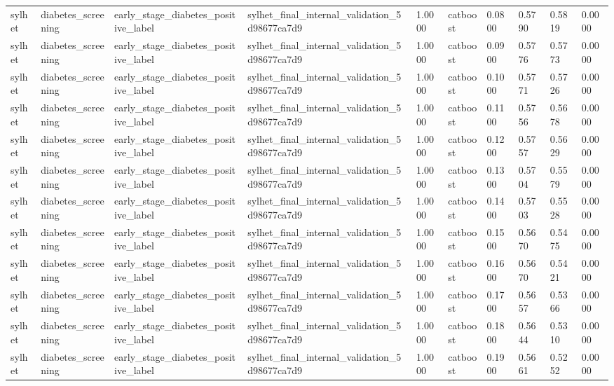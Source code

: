 \begin{tabular}{llllllllll}
sylhet & diabetes\_screening & early\_stage\_diabetes\_positive\_label & sylhet\_final\_internal\_validation\_5d98677ca7d9 & 1.0000 & catboost & 0.0800 & 0.5790 & 0.5819 & 0.0000 \\
sylhet & diabetes\_screening & early\_stage\_diabetes\_positive\_label & sylhet\_final\_internal\_validation\_5d98677ca7d9 & 1.0000 & catboost & 0.0900 & 0.5776 & 0.5773 & 0.0000 \\
sylhet & diabetes\_screening & early\_stage\_diabetes\_positive\_label & sylhet\_final\_internal\_validation\_5d98677ca7d9 & 1.0000 & catboost & 0.1000 & 0.5771 & 0.5726 & 0.0000 \\
sylhet & diabetes\_screening & early\_stage\_diabetes\_positive\_label & sylhet\_final\_internal\_validation\_5d98677ca7d9 & 1.0000 & catboost & 0.1100 & 0.5756 & 0.5678 & 0.0000 \\
sylhet & diabetes\_screening & early\_stage\_diabetes\_positive\_label & sylhet\_final\_internal\_validation\_5d98677ca7d9 & 1.0000 & catboost & 0.1200 & 0.5757 & 0.5629 & 0.0000 \\
sylhet & diabetes\_screening & early\_stage\_diabetes\_positive\_label & sylhet\_final\_internal\_validation\_5d98677ca7d9 & 1.0000 & catboost & 0.1300 & 0.5704 & 0.5579 & 0.0000 \\
sylhet & diabetes\_screening & early\_stage\_diabetes\_positive\_label & sylhet\_final\_internal\_validation\_5d98677ca7d9 & 1.0000 & catboost & 0.1400 & 0.5703 & 0.5528 & 0.0000 \\
sylhet & diabetes\_screening & early\_stage\_diabetes\_positive\_label & sylhet\_final\_internal\_validation\_5d98677ca7d9 & 1.0000 & catboost & 0.1500 & 0.5670 & 0.5475 & 0.0000 \\
sylhet & diabetes\_screening & early\_stage\_diabetes\_positive\_label & sylhet\_final\_internal\_validation\_5d98677ca7d9 & 1.0000 & catboost & 0.1600 & 0.5670 & 0.5421 & 0.0000 \\
sylhet & diabetes\_screening & early\_stage\_diabetes\_positive\_label & sylhet\_final\_internal\_validation\_5d98677ca7d9 & 1.0000 & catboost & 0.1700 & 0.5657 & 0.5366 & 0.0000 \\
sylhet & diabetes\_screening & early\_stage\_diabetes\_positive\_label & sylhet\_final\_internal\_validation\_5d98677ca7d9 & 1.0000 & catboost & 0.1800 & 0.5644 & 0.5310 & 0.0000 \\
sylhet & diabetes\_screening & early\_stage\_diabetes\_positive\_label & sylhet\_final\_internal\_validation\_5d98677ca7d9 & 1.0000 & catboost & 0.1900 & 0.5661 & 0.5252 & 0.0000 \\

\end{tabular}
